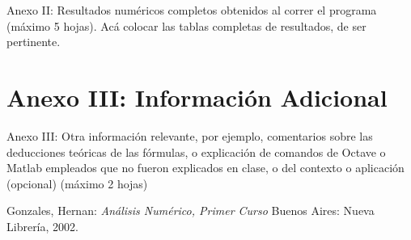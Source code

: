 \documentclass[11pt,a4paper]{article}
\begin{document}
Anexo II: Resultados numéricos completos obtenidos al correr el programa (máximo 5
hojas). Acá colocar las tablas completas de resultados, de ser pertinente.

\section{Anexo III: Información Adicional}
Anexo III: Otra información relevante, por ejemplo, comentarios sobre las deducciones
teóricas de las fórmulas, o explicación de comandos de Octave o Matlab empleados que no
fueron explicados en clase, o del contexto o aplicación (opcional) (máximo 2 hojas)

\newpage

{}
\renewcommand\refname{Bibliografía}
\begin{thebibliography}{9}

Gonzales, Hernan: 
\textit{Análisis Numérico, Primer Curso}
Buenos Aires: Nueva Librería, 2002.

\end{thebibliography}
\end{document}
